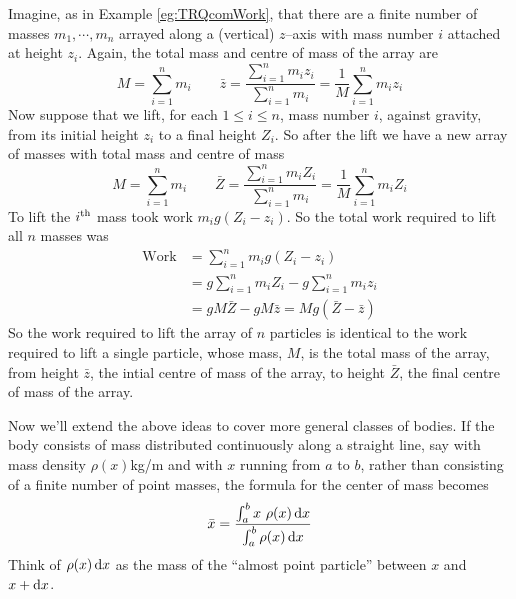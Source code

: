 \begin{eg}\label{eg:TRQcomWorkB}
Imagine, as in Example \ref{eg:TRQcomWork}, that there are a finite number of
masses $m_1,\cdots,m_n$ arrayed along a (vertical) $z$--axis with mass
number $i$ attached at height $z_i$. Again, the total mass and centre of
mass of the array are
\begin{equation*}
M=\sum_{i=1}^n m_i \qquad
\bar z =\frac{\sum_{i=1}^n m_iz_i}{\sum_{i=1}^n m_i}
       =\frac{1}{M} \sum_{i=1}^n m_iz_i
\end{equation*}
Now suppose that we lift, for each $1\le i\le n$, mass number $i$,
against gravity, from its initial height $z_i$ to a final height $Z_i$.
So after the lift we have a new array of masses with total mass and
centre of  mass
\begin{equation*}
M=\sum_{i=1}^n m_i \qquad
\bar Z =\frac{\sum_{i=1}^n m_iZ_i}{\sum_{i=1}^n m_i}
       =\frac{1}{M} \sum_{i=1}^n m_iZ_i
\end{equation*}
To lift the $i^{\rm th}$ mass took work $m_i g (Z_i-z_i)$. So the total
work required to lift all $n$ masses was
\begin{align*}
\text{Work} &= \sum_{i=1}^n  m_i g (Z_i-z_i) \\
            &= g  \sum_{i=1}^n  m_i Z_i  -g \sum_{i=1}^n  m_i z_i \\
            &= g M \bar Z - g M \bar z =Mg(\bar Z-\bar z)
\end{align*}
So the work required to lift the array of $n$ particles  is identical
to the work required to lift a single particle, whose mass, $M$, is
the total mass of the array, from height $\bar z$, the intial centre of mass
of the array, to height $\bar Z$, the final centre of mass of the array.
\end{eg}


Now we'll extend the above ideas to cover more general classes of bodies.
If the body consists of mass distributed continuously along a straight
line, say with mass density $\rho(x)$kg/m and with $x$ running from $a$ to
$b$, rather than consisting of a finite number of point masses,
the formula for the center of mass becomes
\begin{equation}\label{eq:TRQvariabledensityrod}
\bar x = \frac{\int_a^b x\ \rho(x)\,\mathrm{d}x}{\int_a^b \rho(x)\,\mathrm{d}x}
\end{equation}
Think of $\rho(x)\,\mathrm{d}x$ as the mass of the ``almost point particle''
between $x$ and $x+\mathrm{d}x$.

